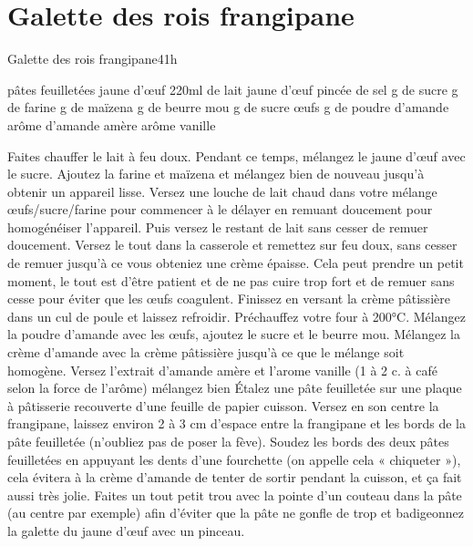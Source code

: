 {\section{Galette des rois frangipane}
\begin{recette}{Galette des rois frangipane}{4}{}{1h}
\begin{ingredients}
 pâtes feuilletées
 jaune d’œuf
\ingredient 220ml de lait
 jaune d’œuf
 pincée de sel
 g de sucre
 g de farine
 g de maïzena
 g de beurre mou
 g de sucre
 œufs
 g de poudre d’amande
\ingredient arôme d’amande amère
\ingredient arôme vanille
\end{ingredients}

\begin{preparation}
\etape Faites chauffer le lait à feu doux.
\etape Pendant ce temps, mélangez le jaune d’œuf avec le sucre. Ajoutez la farine et maïzena et mélangez bien de nouveau jusqu’à obtenir un appareil lisse.
\etape Versez une louche de lait chaud dans votre mélange œufs/sucre/farine pour commencer à le délayer en remuant doucement pour homogénéiser l’appareil.
\etape Puis versez le restant de lait sans cesser de remuer doucement.
\etape Versez le tout dans la casserole et remettez sur feu doux, sans cesser de remuer jusqu’à ce vous obteniez une crème épaisse. Cela peut prendre un petit moment, le tout est d’être patient et de ne pas cuire trop fort et de remuer sans cesse pour éviter que les œufs coagulent.
\etape Finissez en versant la crème pâtissière dans un cul de poule et laissez refroidir.
\etape Préchauffez votre four à 200°C.
\etape Mélangez la poudre d’amande avec les œufs, ajoutez le sucre et le beurre mou.
\etape Mélangez la crème d’amande avec la crème pâtissière jusqu’à ce que le mélange soit homogène.
\etape Versez l’extrait d’amande amère et l’arome vanille (1 à 2 c. à café selon la force de l’arôme) mélangez bien
\etape Étalez une pâte feuilletée sur une plaque à pâtisserie recouverte d’une feuille de papier cuisson. Versez en son centre la frangipane, laissez environ 2 à 3 cm d’espace entre la frangipane et les bords de la pâte feuilletée (n’oubliez pas de poser la fève).
\etape Soudez les bords des deux pâtes feuilletées en appuyant les dents d’une fourchette (on appelle cela « chiqueter »), cela évitera à la crème d’amande de tenter de sortir pendant la cuisson, et ça fait aussi très jolie.
\etape Faites un tout petit trou avec la pointe d’un couteau dans la pâte (au centre par exemple) afin d’éviter que la pâte ne gonfle de trop et badigeonnez la galette du jaune d’œuf avec un pinceau.


\end{preparation}
\end{recette}}
